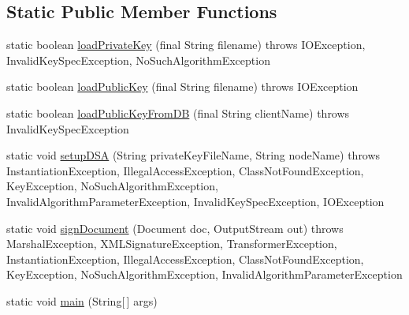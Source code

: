 \subsection*{Static Public Member Functions}
\begin{DoxyCompactItemize}
\item 
static boolean \hyperlink{classgov_1_1fnal_1_1ppd_1_1dd_1_1xml_1_1signature_1_1SignXMLUsingDSAKeys_adf116a793a94389c6e5117b275e6e831}{load\-Private\-Key} (final String filename)  throws I\-O\-Exception, Invalid\-Key\-Spec\-Exception, No\-Such\-Algorithm\-Exception 
\item 
static boolean \hyperlink{classgov_1_1fnal_1_1ppd_1_1dd_1_1xml_1_1signature_1_1SignXMLUsingDSAKeys_af66415b0a2f20bf6149b9d0cb8c64e33}{load\-Public\-Key} (final String filename)  throws I\-O\-Exception 
\item 
static boolean \hyperlink{classgov_1_1fnal_1_1ppd_1_1dd_1_1xml_1_1signature_1_1SignXMLUsingDSAKeys_a309817e89eb4349b00220e86dd5576ec}{load\-Public\-Key\-From\-D\-B} (final String client\-Name)  throws Invalid\-Key\-Spec\-Exception 
\item 
static void \hyperlink{classgov_1_1fnal_1_1ppd_1_1dd_1_1xml_1_1signature_1_1SignXMLUsingDSAKeys_abb9261a032fa3b30e53b00cc00951a1f}{setup\-D\-S\-A} (String private\-Key\-File\-Name, String node\-Name)  throws Instantiation\-Exception, Illegal\-Access\-Exception, Class\-Not\-Found\-Exception, Key\-Exception, No\-Such\-Algorithm\-Exception, 			\-Invalid\-Algorithm\-Parameter\-Exception, Invalid\-Key\-Spec\-Exception, I\-O\-Exception 
\item 
static void \hyperlink{classgov_1_1fnal_1_1ppd_1_1dd_1_1xml_1_1signature_1_1SignXMLUsingDSAKeys_a69c317767c62c0502026667b6366f1e1}{sign\-Document} (Document doc, Output\-Stream out)  throws Marshal\-Exception, X\-M\-L\-Signature\-Exception, Transformer\-Exception, Instantiation\-Exception, Illegal\-Access\-Exception, 			\-Class\-Not\-Found\-Exception, Key\-Exception, No\-Such\-Algorithm\-Exception, Invalid\-Algorithm\-Parameter\-Exception 
\item 
static void \hyperlink{classgov_1_1fnal_1_1ppd_1_1dd_1_1xml_1_1signature_1_1SignXMLUsingDSAKeys_a2d236c020bc49fdb4733a457151ca2cd}{main} (String\mbox{[}$\,$\mbox{]} args)
\end{DoxyCompactItemize}


